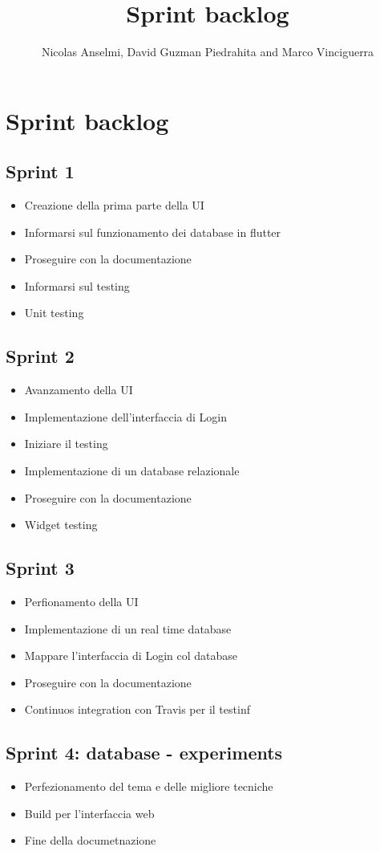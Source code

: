 \documentclass{article}
\title{Sprint backlog}
\author{Nicolas Anselmi, David Guzman Piedrahita and Marco Vinciguerra}
\begin{document}
\maketitle        
\section{Sprint backlog}
 
\subsection{Sprint 1}
\begin{itemize}
    \item Creazione della prima parte della UI
    \item Informarsi sul funzionamento dei database in flutter
    \item Proseguire con la documentazione
    \item Informarsi sul testing
    \item Unit testing
\end{itemize}
\subsection{Sprint 2}
\begin{itemize}
    \item Avanzamento della UI
    \item Implementazione dell'interfaccia di Login
    \item Iniziare il testing
    \item Implementazione di un database relazionale
    \item Proseguire con la documentazione
    \item Widget testing
\end{itemize}
\subsection{Sprint 3}
\begin{itemize}
    \item Perfionamento della UI
    \item Implementazione di un real time database
    \item Mappare l'interfaccia di Login col database
    \item Proseguire con la documentazione 
    \item Continuos integration con Travis per il testinf
\end{itemize}
\subsection{Sprint 4: database - experiments}
\begin{itemize}
    \item Perfezionamento del tema e delle migliore tecniche
    \item Build per l'interfaccia web
    \item Fine della documetnazione
   
\end{itemize}
\end{document}
